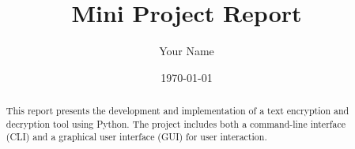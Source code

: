 \documentclass{article}
\begin{document}
\title{Mini Project Report}
\author{Your Name}
\date{\today}


\maketitle

\begin{abstract}
This report presents the development and implementation of a text encryption and decryption tool using Python. The project includes both a command-line interface (CLI) and a graphical user interface (GUI) for user interaction.
\end{abstract}
\end{document}
